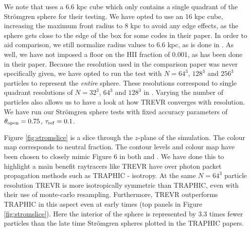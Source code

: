 \documentclass[fleq,usenatbib]{mnras}
\newcommand{\acro}{TREVR}
\newcommand{\tO}{\theta_{\rm open}}
\newcommand{\strom}{Str\"omgren}
\begin{document}
We note that \cite{ilievEt06} uses a 6.6 kpc cube which only contains a single
quadrant of the \strom{} sphere for their testing. We have opted to use an 16 
kpc cube, increasing the maximum front radius to 8 kpc to avoid any edge 
effects, as the sphere gets close to the edge of the box for some codes in 
their paper. In order to aid comparison, we still normalize radius values to 
6.6 kpc, as is done in \cite{ilievEt06}. As well, we have not imposed a floor 
on the HII fraction of 0.001, as has been done in their paper. Because the 
resolution used in the \cite{ilievEt06} comparison paper was never 
specifically given, we have opted to run the test with $N = 64^3$, $128^3$ and 
$256^3$ particles to represent the \textit{entire} sphere. These resolutions 
correspond to single quadrant resolutions of $N=32^3$, $64^3$ and $128^3$ in 
\cite{ilievEt06}. Varying the number of particles also allows us to have a 
look at how \acro{} converges with resolution. We have run our \strom{} sphere 
tests with fixed accuracy parameters of $\tO = 0.75$, 
$\tau_{\rm ref} = 0.1$.

Figure \ref{fig:stromslice} is a slice through the $z$-plane of the 
simulation. The colour map corresponds to neutral fraction. The contour 
levels and colour map have been chosen to closely mimic Figure 6 in both 
\cite{pawlikSchaye08} and \cite{pawlikSchaye11}. We have done this to 
highlight a main benefit raytracers like \acro{} have over photon packet 
propagation methods such as TRAPHIC - isotropy. At the same $N=64^3$ particle 
resolution \acro{} is more isotropically symmetric than TRAPHIC, even with 
their use of monte-carlo resampling. Furthermore, \acro{} outperforms TRAPHIC 
in this aspect even at early times (top panels in Figure 
\ref{fig:stromslice}). Here the interior of the sphere is represented by 3.3 
times fewer particles than the late time \strom{} spheres plotted in the 
TRAPHIC papers.
\end{document}
